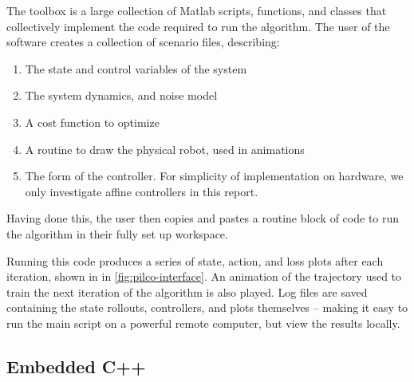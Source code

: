 \documentclass[main.tex]{subfiles}
\begin{document}
	The {\Pilco} toolbox is a large collection of Matlab scripts, functions, and classes that collectively implement the code required to run the {\Pilco} algorithm. The user of the software creates a collection of scenario files, describing:
	\begin{enumerate}[noitemsep]
		\item The state and control variables of the system
		\item The system dynamics, and noise model
		\item A cost function to optimize
		\item A routine to draw the physical robot, used in animations
		\item The form of the controller. For simplicity of implementation on hardware, we only investigate affine controllers in this report.
	\end{enumerate}
	Having done this, the user then copies and pastes a routine block of code to run the {\Pilco} algorithm in their fully set up workspace.

	Running this code produces a series of state, action, and loss plots after each iteration, shown in in \cref{fig:pilco-interface}.
	An animation of the trajectory used to train the next iteration of the algorithm is also played.
	Log files are saved containing the state rollouts, controllers, and plots themselves -- making it easy to run the main script on a powerful remote computer, but view the results locally.

	\subsection{Embedded C++}
\end{document}
